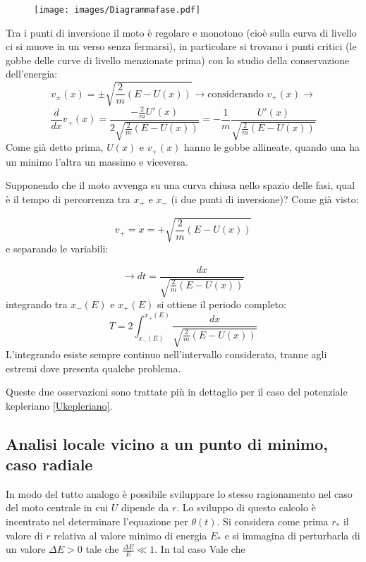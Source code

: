 \documentclass[Main.tex]{subfiles}
\begin{document}
\begin{figure}[H]
    \centering
    \texttt{[image: images/Diagrammafase.pdf]}
\end{figure}

\newpage
\begin{osservazioni}
	\item Tra i punti di inversione il moto è regolare e monotono (cioè sulla curva di livello ci si muove in un verso senza fermarsi), in particolare si trovano i punti critici (le gobbe delle curve di livello menzionate prima) con lo studio della conservazione dell'energia:
\begin{equation}
  v_{\pm} (x) = \pm \sqrt{\frac{2}{m} (E-U(x))} \longrightarrow \text{considerando  $v_+(x)$} \longrightarrow
\end{equation}
\begin{equation}
  \frac{d}{dx}v_+(x) = \frac{-\frac{2}{m}U'(x)}{2 \sqrt{\frac{2}{m}(E-U(x))}} = - \frac{1}{m} \frac{U'(x)}{\sqrt{\frac{2}{m}(E-U(x))}}
\end{equation}
Come già detto prima, $U(x)$ e $v_+(x)$ hanno le gobbe allineate, quando una ha un minimo l'altra un massimo e viceversa.

\item Supponendo che il moto avvenga su una curva chiusa nello spazio delle fasi, qual è il tempo di percorrenza tra $x_+$ e $x_-$ (i due punti di inversione)? Come già visto:

$$v_+=  \dot x= + \sqrt{\frac{2}{m}(E-U(x))}$$
e separando le variabili:

$$
\longrightarrow dt = \frac{dx}{\sqrt{\frac{2}{m} (E-U(x))}}
$$
integrando tra $x_-(E)$ e $x_+(E)$ si ottiene il periodo completo:
\begin{equation}
T= 2 \int_{x_-(E)}^{x_+(E)} \frac{dx}{\sqrt{\frac{2}{m}(E-U(x))}}
\end{equation}
L'integrando esiste sempre continuo nell'intervallo considerato, tranne agli estremi dove presenta qualche problema. 

Queste due osservazioni sono trattate più in dettaglio per il caso del potenziale kepleriano \underline{\ref{Ukepleriano}}.
\end{osservazioni}


\newpage
\subsection{Analisi locale vicino a un punto di minimo, caso radiale}
In modo del tutto analogo è possibile sviluppare lo stesso ragionamento nel caso del moto centrale in cui $U$ dipende da $r$. Lo sviluppo di questo calcolo è incentrato nel determinare l'equazione per $\theta(t)$. Si considera come prima $r_*$ il valore di $r$ relativa al valore minimo di energia $E_*$ e si immagina di perturbarla di un valore $\Delta E >0$ tale che $\frac{\Delta E}{E}\ll 1$. In tal caso Vale che
\end{document}
